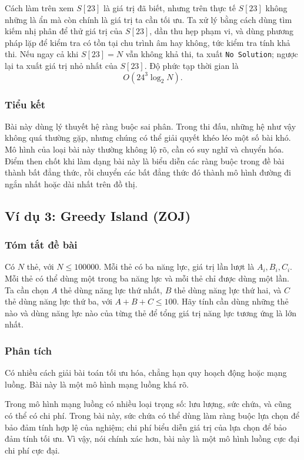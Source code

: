 \documentclass[11pt]{article}
\begin{document}
Cách làm trên xem $S[23]$ là giá trị đã biết, nhưng trên thực tế $S[23]$ không
những là ẩn mà còn chính là giá trị ta cần tối ưu. Ta xử lý bằng cách dùng
tìm kiếm nhị phân để thử giá trị của $S[23]$, dần thu hẹp phạm vi, và dùng
phương pháp lặp để kiểm tra có tồn tại chu trình âm hay không, tức kiểm tra
tính khả thi. Nếu ngay cả khi $S[23]=N$ vẫn không khả thi, ta xuất
\texttt{No Solution}; ngược lại ta xuất giá trị nhỏ nhất của $S[23]$. Độ phức
tạp thời gian là
\[
  O(24^3\log_2 N).
\]

\subsubsection*{Tiểu kết}

Bài này dùng lý thuyết hệ ràng buộc sai phân. Trong thi đấu, những hệ như vậy
không quá thường gặp, nhưng chúng có thể giải quyết khéo léo một số bài khó.
Mô hình của loại bài này thường không lộ rõ, cần có suy nghĩ và chuyển hóa.
Điểm then chốt khi làm dạng bài này là biểu diễn các ràng buộc trong đề bài
thành bất đẳng thức, rồi chuyển các bất đẳng thức đó thành mô hình đường đi
ngắn nhất hoặc dài nhất trên đồ thị.

\subsection{Ví dụ 3: Greedy Island (ZOJ)}

\subsubsection*{Tóm tắt đề bài}

Có $N$ thẻ, với $N\le 100000$. Mỗi thẻ có ba năng lực, giá trị lần lượt là
$A_i,B_i,C_i$. Mỗi thẻ có thể dùng một trong ba năng lực và mỗi thẻ chỉ được
dùng một lần. Ta cần chọn $A$ thẻ dùng năng lực thứ nhất, $B$ thẻ dùng năng
lực thứ hai, và $C$ thẻ dùng năng lực thứ ba, với $A+B+C\le 100$. Hãy tính
cần dùng những thẻ nào và dùng năng lực nào của từng thẻ để tổng giá trị năng
lực tương ứng là lớn nhất.

\subsubsection*{Phân tích}

Có nhiều cách giải bài toán tối ưu hóa, chẳng hạn quy hoạch động hoặc mạng
luồng. Bài này là một mô hình mạng luồng khá rõ.

Trong mô hình mạng luồng có nhiều loại trọng số: lưu lượng, sức chứa, và cũng
có thể có chi phí. Trong bài này, sức chứa có thể dùng làm ràng buộc lựa chọn
để bảo đảm tính hợp lệ của nghiệm; chi phí biểu diễn giá trị của lựa chọn để
bảo đảm tính tối ưu. Vì vậy, nói chính xác hơn, bài này là một mô hình luồng
cực đại chi phí cực đại.
\end{document}
